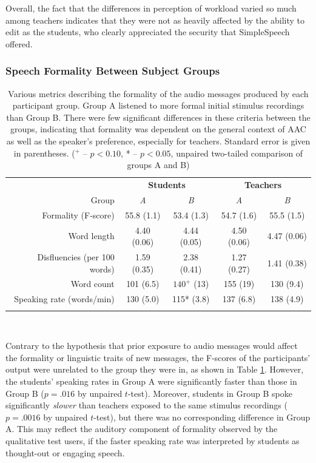 Overall, the fact that the differences in perception of workload varied so much among teachers indicates that they were not as heavily affected by the ability to edit as the students, who clearly appreciated the security that SimpleSpeech offered.

\subsubsection{Speech Formality Between Subject Groups}
\begin{table}
	\centering
	\begin{tabular}{r c c c c}
		\toprule
		& \multicolumn{2}{c}{\textbf{Students}} & \multicolumn{2}{c}{\textbf{Teachers}} \\
		Group                        & \textit{A} & \textit{B}  & \textit{A} & \textit{B} \\
		Formality (F-score)          & 55.8 (1.1)   & 53.4 (1.3)         & 54.7 (1.6)   & 55.5 (1.5)\\
		Word length                  & 4.40 (0.06)   & 4.44 (0.05)           & 4.50 (0.06)    & 4.47 (0.06)\\
		Disfluencies (per 100 words) & 1.59 (0.35)    & 2.38 (0.41)          & 1.27 (0.27)    & 1.41 (0.38)\\
		Word count                   & 101 (6.5)  & $140^+$ (13)      & 155 (19)  & 130 (9.4)\\
		Speaking rate (words/min)    & 130 (5.0)  & 115* (3.8)      & 137 (6.8)  & 138 (4.9)\\
		\bottomrule \\
	\end{tabular}
	\caption{Various metrics describing the formality of the audio messages produced by each participant group. Group A listened to more formal initial stimulus recordings than Group B. There were few significant differences in these criteria between the groups, indicating that formality was dependent on the general context of AAC as well as the speaker's preference, especially for teachers. Standard error is given in parentheses. ($^+$ -- $p<0.10$, * -- $p<0.05$, unpaired two-tailed comparison of groups A and B)}~\label{tab:formality}
\end{table}

Contrary to the hypothesis that prior exposure to audio messages would affect the formality or linguistic traits of new messages, the F-scores of the participants' output were unrelated to the group they were in, as shown in Table \ref{tab:formality}.
However, the students' speaking rates in Group A were significantly faster than those in Group B ($p=.016$ by unpaired $t$-test).
Moreover, students in Group B spoke significantly \textit{slower} than teachers exposed to the same stimulus recordings ($p=.0016$ by unpaired $t$-test), but there was no corresponding difference in Group A.
This may reflect the auditory component of formality observed by the qualitative test users, if the faster speaking rate was interpreted by students as thought-out or engaging speech.

